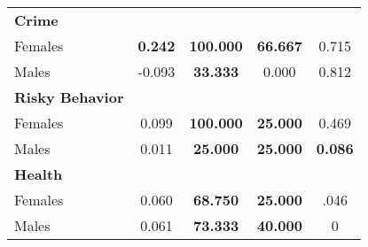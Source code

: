 \begin{tabular}{l c c c c}
\midrule
\textbf{Crime} & & & & \\
\quad Females &  \textbf{    0.242} & \textbf{  100.000} & \textbf{   66.667} & 0.715 \\
\quad Males &     -0.093 & \textbf{   33.333} &     0.000 & 0.812 \\
\midrule
\textbf{Risky Behavior} & & & & \\
\quad Females &      0.099 & \textbf{  100.000} & \textbf{   25.000} & 0.469 \\
\quad Males &      0.011 & \textbf{   25.000} & \textbf{   25.000} & \textbf{ 0.086} \\
\midrule
\textbf{Health} & & & & \\
\quad Females &      0.060 & \textbf{   68.750} & \textbf{   25.000} & .046 \\
\quad Males &      0.061 & \textbf{   73.333} & \textbf{   40.000} & 0 \\
\bottomrule
\end{tabular}

